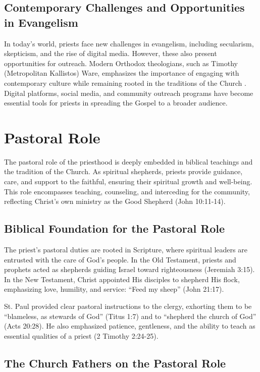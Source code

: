 \documentclass[12pt, doc]{apa7}   	%
\begin{document}
\subsection{Contemporary Challenges and Opportunities in Evangelism}

In today’s world, priests face new challenges in evangelism, including secularism, skepticism, and the rise of digital media. However, these also present opportunities for outreach. Modern Orthodox theologians, such as Timothy (Metropolitan Kallistos) Ware, emphasizes the importance of engaging with contemporary culture while remaining rooted in the traditions of the Church \citep{orthodox_church_ware}. Digital platforms, social media, and community outreach programs have become essential tools for priests in spreading the Gospel to a broader audience.


\section{Pastoral Role}\label{pastoral}

The pastoral role of the priesthood is deeply embedded in biblical teachings and the tradition of the Church. As spiritual shepherds, priests provide guidance, care, and support to the faithful, ensuring their spiritual growth and well-being. This role encompasses teaching, counseling, and interceding for the community, reflecting Christ’s own ministry as the Good Shepherd (John 10:11-14).

\subsection{Biblical Foundation for the Pastoral Role}

The priest’s pastoral duties are rooted in Scripture, where spiritual leaders are entrusted with the care of God’s people. In the Old Testament, priests and prophets acted as shepherds guiding Israel toward righteousness (Jeremiah 3:15). In the New Testament, Christ appointed His disciples to shepherd His flock, emphasizing love, humility, and service: ``Feed my sheep'' (John 21:17).

St. Paul provided clear pastoral instructions to the clergy, exhorting them to be ``blameless, as stewards of God'' (Titus 1:7) and to ``shepherd the church of God'' (Acts 20:28). He also emphasized patience, gentleness, and the ability to teach as essential qualities of a priest (2 Timothy 2:24-25).

\subsection{The Church Fathers on the Pastoral Role}
\end{document}

